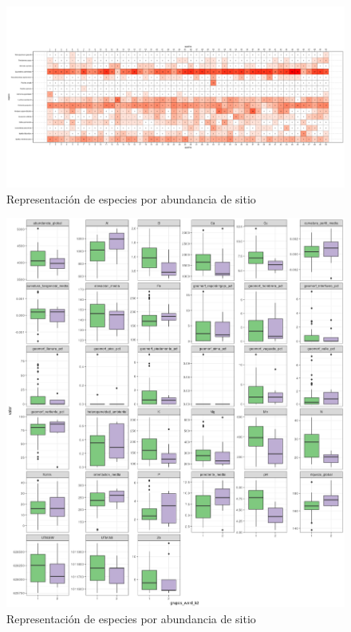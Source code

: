 \documentclass[11pt,]{article}
\begin{document}
\begin{figure}
\centering
\includegraphics{especies.png}
\caption{Representación de especies por abundancia de
sitio\label{abundancia}}
\end{figure}

\begin{figure}
\centering
\includegraphics[width=1.10000\textwidth]{Rplot01_diagrama_caja_agrpados.png}
\caption{Representación de especies por abundancia de
sitio\label{homogeneidades}}
\end{figure}
\end{document}
